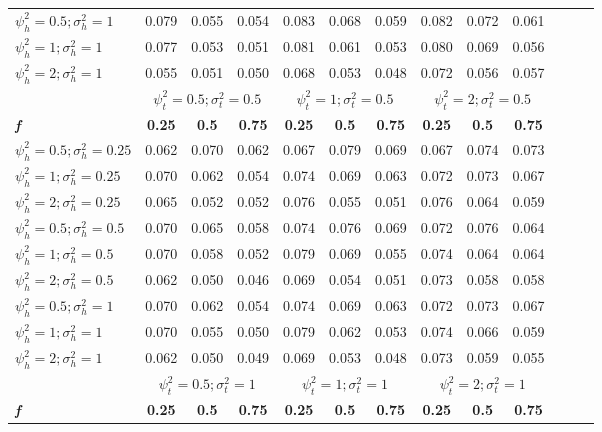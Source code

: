 \documentclass[AMA,STIX1COL,]{WileyNJD-v2}
\begin{document}
\begin{table}[ht]
{\begin{tabular}{l c c c c c c c c c c c c}
$\psi_h^2 = 0.5; \sigma_h^2 = 1$ & 0.079 & 0.055 & 0.054 & 0.083 & 0.068 & 0.059 & 0.082 & 0.072 & 0.061 \\
$\psi_h^2 = 1; \sigma_h^2 = 1$ & 0.077 & 0.053 & 0.051 & 0.081 & 0.061 & 0.053 & 0.080 & 0.069 & 0.056 \\
$\psi_h^2 = 2; \sigma_h^2 = 1$ & 0.055 & 0.051 & 0.050 & 0.068 & 0.053 & 0.048 & 0.072 & 0.056 & 0.057 \\
\hline 
 & \multicolumn{3}{c}{$\psi_t^2 = 0.5; \sigma_t^2 = 0.5$} & \multicolumn{3}{c}{$\psi_t^2 = 1; \sigma_t^2 = 0.5$} & \multicolumn{3}{c}{$\psi_t^2= 2; \sigma_t^2 = 0.5$} \\
\addlinespace[1pt]
\cmidrule(lr){2-4} \cmidrule(lr){5-7} \cmidrule(lr){8-10}
\textbf{\textit{f}} & \textbf{0.25} & \textbf{0.5} & \textbf{0.75} & \textbf{0.25} & \textbf{0.5} & \textbf{0.75} & \textbf{0.25} & \textbf{0.5} & \textbf{0.75} \\
\hline
$\psi_h^2 = 0.5; \sigma_h^2 = 0.25$ & 0.062 & 0.070 & 0.062 & 0.067 & 0.079 & 0.069 & 0.067 & 0.074 & 0.073 \\
$\psi_h^2 = 1; \sigma_h^2 = 0.25$ & 0.070 & 0.062 & 0.054 & 0.074 & 0.069 & 0.063 & 0.072 & 0.073 & 0.067 \\
$\psi_h^2 = 2; \sigma_h^2 = 0.25$ & 0.065 & 0.052 & 0.052 & 0.076 & 0.055 & 0.051 & 0.076 & 0.064 & 0.059 \\
$\psi_h^2 = 0.5; \sigma_h^2 = 0.5$ & 0.070 & 0.065 & 0.058 & 0.074 & 0.076 & 0.069 & 0.072 & 0.076 & 0.064 \\
$\psi_h^2 = 1; \sigma_h^2 = 0.5$ & 0.070 & 0.058 & 0.052 & 0.079 & 0.069 & 0.055 & 0.074 & 0.064 & 0.064 \\
$\psi_h^2 = 2; \sigma_h^2 = 0.5$ & 0.062 & 0.050 & 0.046 & 0.069 & 0.054 & 0.051 & 0.073 & 0.058 & 0.058 \\
$\psi_h^2 = 0.5; \sigma_h^2 = 1$ & 0.070 & 0.062 & 0.054 & 0.074 & 0.069 & 0.063 & 0.072 & 0.073 & 0.067 \\
$\psi_h^2 = 1; \sigma_h^2 = 1$ & 0.070 & 0.055 & 0.050 & 0.079 & 0.062 & 0.053 & 0.074 & 0.066 & 0.059 \\
$\psi_h^2 = 2; \sigma_h^2 = 1$ & 0.062 & 0.050 & 0.049 & 0.069 & 0.053 & 0.048 & 0.073 & 0.059 & 0.055 \\
\hline 
 & \multicolumn{3}{c}{$\psi_t^2 = 0.5; \sigma_t^2 = 1$} & \multicolumn{3}{c}{$\psi_t^2 = 1; \sigma_t^2 = 1$} & \multicolumn{3}{c}{$\psi_t^2 = 2; \sigma_t^2 = 1$} \\
\addlinespace[1pt]
\cmidrule(lr){2-4} \cmidrule(lr){5-7} \cmidrule(lr){8-10}
\textbf{\textit{f}} & \textbf{0.25} & \textbf{0.5} & \textbf{0.75} & \textbf{0.25} & \textbf{0.5} & \textbf{0.75} & \textbf{0.25} & \textbf{0.5} & \textbf{0.75} \\

\end{tabular}}
\end{table}
\end{document}

